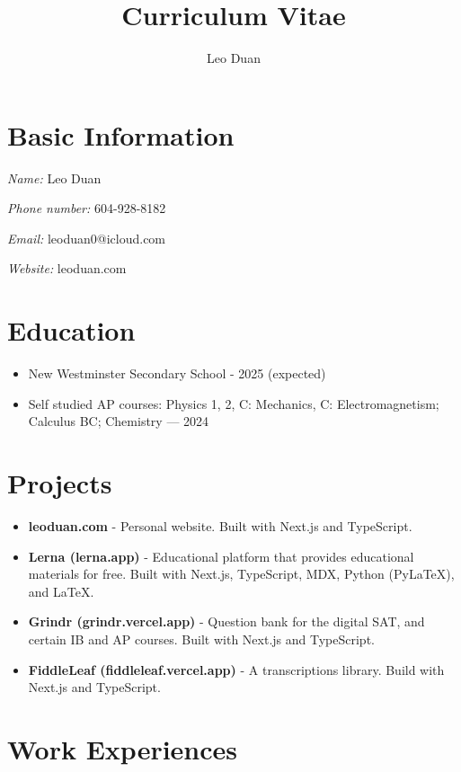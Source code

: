 \documentclass{article}
\title{\textbf{Curriculum Vitae}}
\author{Leo Duan}
\date{}
\begin{document}
\maketitle

\section*{Basic Information}%

\textit{Name:} Leo Duan

\textit{Phone number:} 604-928-8182

\textit{Email:} leoduan0@icloud.com

\textit{Website:} leoduan.com

\section*{Education}%

\begin{itemize}
\item New Westminster Secondary School - 2025 (expected)
\item Self studied AP courses: Physics 1, 2, C: Mechanics, C: Electromagnetism; Calculus BC; Chemistry — 2024 %
\end{itemize}

\section*{Projects}%

\begin{itemize}
\item \textbf{leoduan.com} - Personal website. Built with Next.js and TypeScript.
\item \textbf{Lerna (lerna.app)} - Educational platform that provides educational materials for free. Built with Next.js, TypeScript, MDX, Python (PyLaTeX), and LaTeX.
\item \textbf{Grindr (grindr.vercel.app)} - Question bank for the digital SAT, and certain IB and AP courses. Built with Next.js and TypeScript.
\item \textbf{FiddleLeaf (fiddleleaf.vercel.app)} - A transcriptions library. Build with Next.js and TypeScript.
\end{itemize}

\section*{Work Experiences}%
\end{document}
